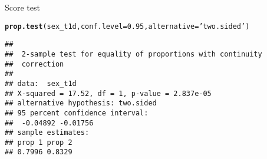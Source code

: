 \documentclass{beamer}
\makeatletter
\newcommand{\hlnum}[1]{\textcolor[rgb]{0.686,0.059,0.569}{#1}}%
\newcommand{\hlstr}[1]{\textcolor[rgb]{0.192,0.494,0.8}{#1}}%
\newcommand{\hlopt}[1]{\textcolor[rgb]{0,0,0}{#1}}%
\newcommand{\hlstd}[1]{\textcolor[rgb]{0.345,0.345,0.345}{#1}}%
\newcommand{\hlkwb}[1]{\textcolor[rgb]{0.69,0.353,0.396}{#1}}%
\newcommand{\hlkwc}[1]{\textcolor[rgb]{0.333,0.667,0.333}{#1}}%
\newcommand{\hlkwd}[1]{\textcolor[rgb]{0.737,0.353,0.396}{\textbf{#1}}}%
\newenvironment{kframe}{%
 \def\at@end@of@kframe{}%
 \ifinner\ifhmode%
  \def\at@end@of@kframe{\end{minipage}}%
  \begin{minipage}{\columnwidth}%
 \fi\fi%
 \def\FrameCommand##1{\hskip\@totalleftmargin \hskip-\fboxsep
 \colorbox{shadecolor}{##1}\hskip-\fboxsep
     \hskip-\linewidth \hskip-\@totalleftmargin \hskip\columnwidth}%
 \MakeFramed {\advance\hsize-\width
   \@totalleftmargin\z@ \linewidth\hsize
   \@setminipage}}%
 {\par\unskip\endMakeFramed%
 \at@end@of@kframe}
\newenvironment{knitrout}{}{} %
\makeatother
\begin{document}

\begin{frame}[fragile]{Score test}
\begin{knitrout}\tiny
{}\color{fgcolor}\begin{kframe}
\begin{alltt}
\hlkwd{prop.test}\hlstd{(sex_t1d,} \hlkwc{conf.level}\hlstd{=}\hlnum{0.95}\hlstd{,} \hlkwc{alternative}\hlstd{=}\hlstr{'two.sided'}\hlstd{)}
\end{alltt}
\begin{verbatim}
## 
## 	2-sample test for equality of proportions with continuity
## 	correction
## 
## data:  sex_t1d
## X-squared = 17.52, df = 1, p-value = 2.837e-05
## alternative hypothesis: two.sided
## 95 percent confidence interval:
##  -0.04892 -0.01756
## sample estimates:
## prop 1 prop 2 
## 0.7996 0.8329
\end{verbatim}
\end{kframe}
\end{knitrout}
\end{frame}
\end{document}
